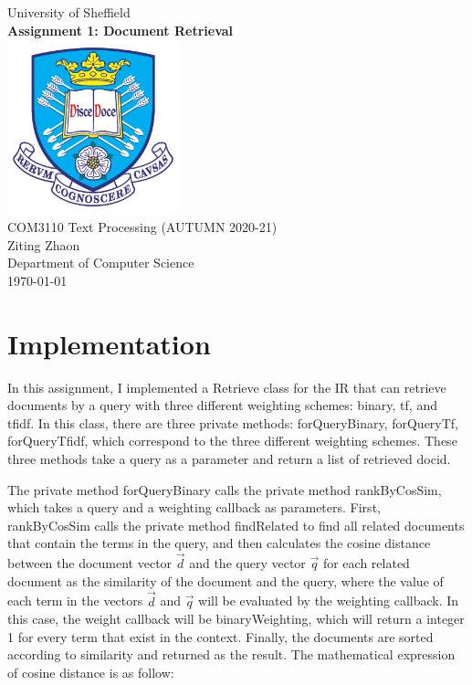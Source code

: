 \documentclass[11pt,a4paper]{article}
\begin{document}
\begin{titlepage}


\begin{center}
{\LARGE University of Sheffield}\\[1.5cm]
\linespread{1.2}\huge {\bfseries Assignment 1: Document Retrieval}\\[1.5cm]
\linespread{1}
\includegraphics[width=5cm]{images/tuoslogo.png}\\[1cm]
{\large COM3110 Text Processing (AUTUMN 2020-21)}\\[1cm]
{\Large Ziting Zhaon}\\[6cm]
\large Department of Computer Science\\[1cm]
\today
\end{center}

\end{titlepage}


\newpage
\section*{\Large Implementation}

In this assignment, I implemented a Retrieve class for the IR that can retrieve documents by a query with three different weighting schemes: binary, tf, and tfidf. In this class, there are three private methods: forQueryBinary, forQueryTf, forQueryTfidf, which correspond to the three different weighting schemes. These three methods take a query as a parameter and return a list of retrieved docid. 

The private method forQueryBinary calls the private method rankByCosSim, which takes a query and a weighting callback as parameters. First, rankByCosSim calls the private method findRelated to find all related documents that contain the terms in the query, and then calculates the cosine distance between the document vector $\vec{d}$ and the query vector $\vec{q}$ for each related document as the similarity of the document and the query, where the value of each term in the vectors $\vec{d}$ and $\vec{q}$ will be evaluated by the weighting callback. In this case, the weight callback will be binaryWeighting, which will return a integer 1 for every term that exist in the context. Finally, the documents are sorted according to similarity and returned as the result. The mathematical expression of cosine distance is as follow:
\end{document}
